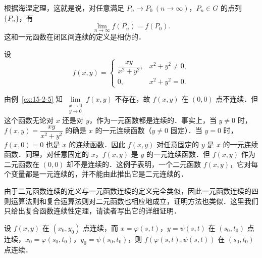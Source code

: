 \begin{figure}[htbp]
\centering
{}\caption{\relax}\label{fig:15-18}
\end{figure}

根据海涅定理，这就是说，对任意满足 $P_{n}\to P_{0}\ (n\to\infty)$，$P_{n}\in G$ 的点列 $\{P_{n}\}$，有
\[
\lim_{n\to\infty}f(P_{n})=f(P_{0}).
\]
这和一元函数在闭区间连续的定义是相仿的．

\begin{example}\label{ex:15-2-10}
设
\[
f(x,y)=\begin{cases}
\dfrac{xy}{x^{2}+y^{2}}, & x^{2}+y^{2}\neq0,\\[4pt]
0, & x^{2}+y^{2}=0.
\end{cases}
\]
\end{example}

由例~\ref{ex:15-2-5} 知 $\lim\limits_{\substack{x\to0\\y\to0}}f(x,y)$ 不存在，故 $f(x,y)$ 在 $(0,0)$ 点不连续．但这个函数无论对 $x$ 还是对 $y$，作为一元函数都是连续的．事实上，当 $y\neq0$ 时，$f(x,y)=\dfrac{xy}{x^{2}+y^{2}}$ 的确是 $x$ 的一元连续函数（$y\neq0$ 固定）．当 $y=0$ 时，$f(x,0)=0$ 也是 $x$ 的连续函数．因此 $f(x,y)$ 对任意固定的 $y$ 是 $x$ 的一元连续函数．同理，对任意固定的 $x$，$f(x,y)$ 是 $y$ 的一元连续函数．但 $f(x,y)$ 作为二元函数在 $(0,0)$ 却不是连续的．这例子表明，一个二元函数 $f(x,y)$，它对每个变量都是一元连续的，并不能由此推出它是二元连续的．

由于二元函数连续的定义与一元函数连续的定义完全类似，因此一元函数连续的四则运算法则和复合运算法则对二元函数也相应地成立，证明方法也类似．这里我们只给出复合函数连续性定理，请读者写出它的详细证明．

\begin{theorem}[复合函数的连续性]\label{thm:15-7}
设 $f(x,y)$ 在 $(x_{0},y_{0})$ 点连续，而 $x=\varphi(s,t)$，$y=\psi(s,t)$ 在 $(s_{0},t_{0})$ 点连续，$x_{0}=\varphi(s_{0},t_{0})$，$y_{0}=\psi(s_{0},t_{0})$，则 $f(\varphi(s,t),\psi(s,t))$ 在 $(s_{0},t_{0})$ 点连续．
\end{theorem}

